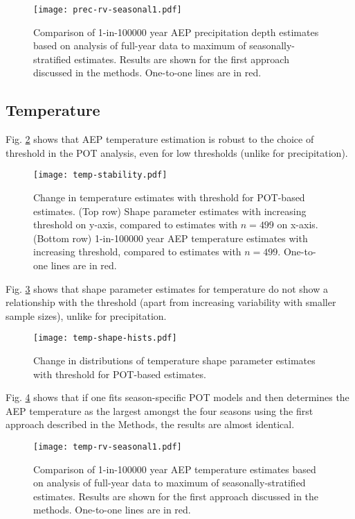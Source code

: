 \documentclass{ametsocV6.1}
\begin{document}
\begin{figure}[H]
    \centering
    \texttt{[image: prec-rv-seasonal1.pdf]}
    \caption{Comparison of 1-in-100000 year AEP precipitation depth estimates based on analysis of full-year data to maximum of seasonally-stratified estimates. Results are shown for the first approach discussed in the methods. One-to-one lines are in red.}
    \label{fig:prec-rv-seasonal1}
\end{figure}

\subsection*{Temperature}

Fig. \ref{fig:temp-stability} shows that AEP temperature estimation is robust to the choice of threshold in the POT analysis, even for low thresholds (unlike for precipitation).

\begin{figure}[H]
    \centering
    \texttt{[image: temp-stability.pdf]}
    \caption{Change in temperature estimates with threshold for POT-based estimates. (Top row) Shape parameter estimates with increasing threshold on y-axis, compared to estimates with $n=499$ on x-axis. (Bottom row) 1-in-100000 year AEP temperature estimates with increasing threshold, compared to estimates with $n=499$. One-to-one lines are in red.}
    \label{fig:temp-stability}
\end{figure}

Fig. \ref{fig:temp-shape-hists} shows that shape parameter estimates for temperature do not show a relationship with the threshold (apart from increasing variability with smaller sample sizes), unlike for precipitation.

\begin{figure}[H]
    \centering
    \texttt{[image: temp-shape-hists.pdf]}
    \caption{Change in distributions of temperature shape parameter estimates with threshold for POT-based estimates.}
    \label{fig:temp-shape-hists}
\end{figure}

Fig. \ref{fig:temp-rv-seasonal1} shows that if one fits season-specific POT models and then determines the AEP temperature as the largest amongst the four seasons using the first approach described in the Methods, the results are almost identical.

\begin{figure}[H]
    \centering
    \texttt{[image: temp-rv-seasonal1.pdf]}
    \caption{Comparison of 1-in-100000 year AEP temperature estimates based on analysis of full-year data to maximum of seasonally-stratified estimates. Results are shown for the first approach discussed in the methods. One-to-one lines are in red.}
    \label{fig:temp-rv-seasonal1}
\end{figure}

\clearpage


\end{document}
